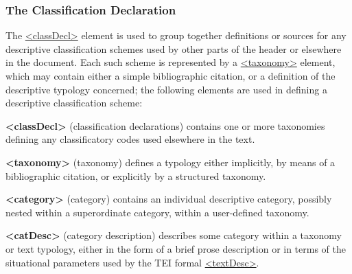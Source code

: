 \subsubsection[{The Classification Declaration}]{The Classification Declaration}\label{HD55}\par
The \hyperref[TEI.classDecl]{<classDecl>} element is used to group together definitions or sources for any descriptive classification schemes used by other parts of the header or elsewhere in the document. Each such scheme is represented by a \hyperref[TEI.taxonomy]{<taxonomy>} element, which may contain either a simple bibliographic citation, or a definition of the descriptive typology concerned; the following elements are used in defining a descriptive classification scheme: 
\begin{sansreflist}
  
\item [\textbf{<classDecl>}] (classification declarations) contains one or more taxonomies defining any classificatory codes used elsewhere in the text.
\item [\textbf{<taxonomy>}] (taxonomy) defines a typology either implicitly, by means of a bibliographic citation, or explicitly by a structured taxonomy.
\item [\textbf{<category>}] (category) contains an individual descriptive category, possibly nested within a superordinate category, within a user-defined taxonomy.
\item [\textbf{<catDesc>}] (category description) describes some category within a taxonomy or text typology, either in the form of a brief prose description or in terms of the situational parameters used by the TEI formal \hyperref[TEI.textDesc]{<textDesc>}.
\end{sansreflist}
